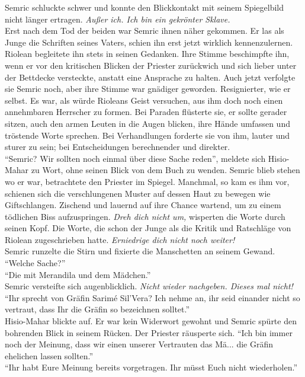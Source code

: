 Semric schluckte schwer und konnte den Blickkontakt mit seinem Spiegelbild nicht länger ertragen. 
\textit{Außer ich. Ich bin ein gekrönter Sklave.}\\
Erst nach dem Tod der beiden war Semric ihnen näher gekommen. Er las als Junge die Schriften seines 
Vaters, schien ihn erst jetzt wirklich kennenzulernen. Riolean begleitete ihn stets in seinen 
Gedanken. Ihre Stimme beschimpfte ihn, wenn er vor den kritischen Blicken der Priester zurückwich 
und sich lieber unter der Bettdecke versteckte, anstatt eine Ansprache zu halten. Auch jetzt 
verfolgte sie Semric noch, aber ihre Stimme war gnädiger geworden. Resignierter, wie er selbst. Es 
war, als würde Rioleans Geist versuchen, aus ihm doch noch einen annehmbaren Herrscher zu formen. 
Bei Paraden flüsterte sie, er sollte gerader sitzen, auch den armen Leuten in die Augen blicken, 
ihre Hände umfassen und tröstende Worte sprechen. Bei Verhandlungen forderte sie von ihm, lauter und 
sturer zu sein; bei Entscheidungen berechnender und direkter.\\
``Semric? Wir sollten noch einmal über diese Sache reden'', meldete sich Hisio-Mahar zu Wort, ohne 
seinen Blick von dem Buch zu wenden. Semric blieb stehen wo er war, betrachtete den Priester im 
Spiegel. Manchmal, so kam es ihm vor, schienen sich die verschlungenen Muster auf dessen Haut zu 
bewegen wie Giftschlangen. Zischend und lauernd auf ihre Chance wartend, um zu einem tödlichen Biss 
aufzuspringen. \textit{Dreh dich nicht um,} wisperten die Worte durch seinen Kopf. Die Worte, die 
schon der Junge als die Kritik und Ratschläge von Riolean zugeschrieben hatte. \textit{Erniedrige 
dich nicht noch weiter!}\\
Semric runzelte die Stirn und fixierte die Manschetten an seinem Gewand. ``Welche Sache?''\\
``Die mit Merandila und dem Mädchen.''\\
Semric versteifte sich augenblicklich. \textit{Nicht wieder nachgeben. Dieses mal nicht!}\\
``Ihr sprecht von Gräfin Sarimé Sil'Vera? Ich nehme an, ihr seid einander nicht so vertraut, dass 
Ihr die Gräfin so bezeichnen solltet.''\\
Hisio-Mahar blickte auf. Er war kein Widerwort gewohnt und Semric spürte den bohrenden Blick in 
seinem Rücken. Der Priester räusperte sich. ``Ich bin immer noch der Meinung, dass wir einen 
unserer Vertrauten das Mä... die Gräfin ehelichen lassen sollten.''\\
``Ihr habt Eure Meinung bereits vorgetragen. Ihr müsst Euch nicht wiederholen.''\\
